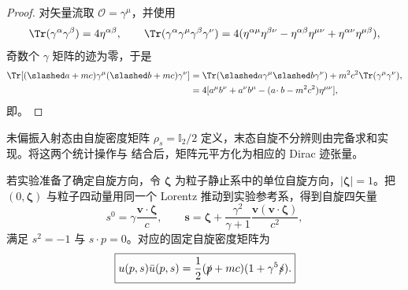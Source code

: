 \begin{proof}
对矢量流取 $\mathcal O=\gamma^\mu$，并使用
\begin{equation*}
 \Tr(\gamma^\alpha\gamma^\beta)=4\eta^{\alpha\beta},
 \qquad
 \Tr(\gamma^\alpha\gamma^\mu\gamma^\beta\gamma^\nu)
 =4(\eta^{\alpha\mu}\eta^{\beta\nu}
 -\eta^{\alpha\beta}\eta^{\mu\nu}
 +\eta^{\alpha\nu}\eta^{\mu\beta}),
\end{equation*}
奇数个 $\gamma$ 矩阵的迹为零，于是
\begin{align*}
 \Tr[(\slashed a+mc)\gamma^\mu(\slashed b+mc)\gamma^\nu]
 &=\Tr(\slashed a\gamma^\mu\slashed b\gamma^\nu)
 +m^2c^2\Tr(\gamma^\mu\gamma^\nu),\\
 &=4[a^\mu b^\nu+a^\nu b^\mu-(a\!\cdot b-m^2c^2)\eta^{\mu\nu}],
\end{align*}
即。
\end{proof}

未偏振入射态由自旋密度矩阵 $\rho_s=\mathbb I_2/2$ 定义，末态自旋不分辨则由完备求和实现。将这两个统计操作与 结合后，矩阵元平方化为相应的 Dirac 迹张量。

若实验准备了确定自旋方向，令 \(\boldsymbol\zeta\) 为粒子静止系中的单位自旋方向，\(|\boldsymbol\zeta|=1\)。把 \((0,\boldsymbol\zeta)\) 与粒子四动量用同一个 Lorentz 推动到实验参考系，得到自旋四矢量
\begin{equation}
 \boxed{
 s^0=\gamma\frac{\mathbf v\!\cdot\boldsymbol\zeta}{c},
 \qquad
 \mathbf s
 =\boldsymbol\zeta
 +\frac{\gamma^2}{\gamma+1}
 \frac{\mathbf v(\mathbf v\!\cdot\boldsymbol\zeta)}{c^2},}
 \label{eq:spin-fourvector-r9}
\end{equation}
满足 \(s^2=-1\) 与 \(s\!\cdot p=0\)。对应的固定自旋密度矩阵为
\begin{equation}
 \boxed{
 u(p,s)\bar u(p,s)
 =\frac12(\slashed p+mc)(1+\gamma^5\slashed s).}
 \label{eq:polarized-spinor-projector-r9}
\end{equation}


